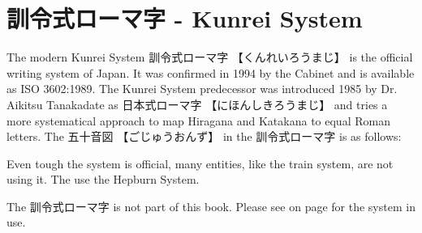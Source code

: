 \section{訓令式ローマ字 - Kunrei System} \label{sec:Kunrei}

The modern Kunrei System {訓令式ローマ字} {【くんれいろうまじ】}  is the
official writing system of Japan. It was confirmed in 1994 by the Cabinet and
is available as ISO 3602:1989. The Kunrei System predecessor was introduced
1985 by Dr. Aikitsu Tanakadate as {日本式ローマ字} {【にほんしきろうまじ】} and
tries a more systematical approach to map Hiragana and Katakana to equal Roman
letters. The {五十音図} {【ごじゅうおんず】} in the {訓令式ローマ字} is as
follows:


Even tough the system is official, many entities, like the train system, are
not using it. The use the Hepburn System.

The {訓令式ローマ字} is not part of this book. Please see 
on page \pageref{sec:Hepburn} for the system in use.
